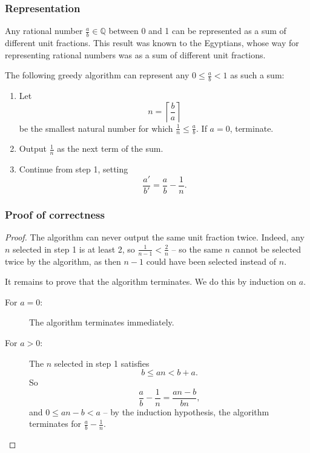 \documentclass[12pt]{article}
\newcommand{\Rats}{\mathbb{Q}}
\begin{document}
\subsubsection*{Representation}
Any rational number $\frac{a}{b}\in\Rats$ between 0 and 1 can be represented as a sum of different unit fractions.  This result was known to the Egyptians, whose way for representing rational numbers was as a sum of different unit fractions.

The following greedy algorithm can represent any $0\le \frac{a}{b} <1$ as such a sum:
\begin{enumerate}
\item Let
$$
n = \left \lceil \frac{b}{a} \right \rceil
$$
be the smallest natural number for which $\frac{1}{n} \le \frac{a}{b}$.  If $a=0$, terminate.
\item Output $\frac{1}{n}$ as the next term of the sum.
\item Continue from step 1, setting
$$\frac{a'}{b'} = \frac{a}{b}-\frac{1}{n}.$$
\end{enumerate}

\subsubsection*{Proof of correctness}
\begin{proof}
The algorithm can never output the same unit fraction twice.  Indeed, any $n$ selected in step 1 is at least 2, so $\frac{1}{n-1} < \frac{2}{n}$ -- so the same $n$ cannot be selected twice by the algorithm, as then $n-1$ could have been selected instead of $n$.

It remains to prove that the algorithm terminates.  We do this by induction on $a$.
\begin{description}
\item[For $a=0$:] The algorithm terminates immediately.
\item[For $a>0$:]
The $n$ selected in step 1 satisfies
$$b \le an < b+a.$$
So
$$
\frac{a}{b}-\frac{1}{n} = \frac{an-b}{bn},
$$
and $0 \le an-b < a$ -- by the induction hypothesis, the algorithm terminates for $\frac{a}{b}-\frac{1}{n}$.
\end{description}
\end{proof}
\end{document}
